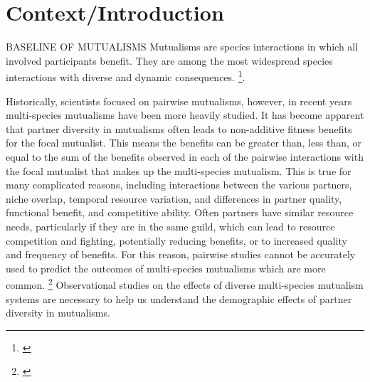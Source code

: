 \documentclass[12pt,a4paper]{article}
\newcommand{\ali}[2]{{\color{pink}{#1}}\footnote{\textit{\color{pink}{#2}}}}
\begin{document}
\section*{Context/Introduction}
BASELINE OF MUTUALISMS
Mutualisms are species interactions in which all involved participants benefit. They are among the most widespread species interactions\cite{Chamberlain2014,Stachowicz2005,BoucherDouglasH.1985} with diverse and dynamic consequences. 
\ali{The benefits from these interactions are called rewards, but they require investment of resources into the interaction}{I'm honestly not sure if I need to explain this idea? Do I need to include more basic mutualism background? I have tried to shift this so that I cover a small amount and then jump into the idea of partner diversity in mutualisms instead}. 

Historically, scientists focused on pairwise mutualisms\cite{Bascompote2019}, however, in recent years multi-species mutualisms have been more heavily studied. 
It has become apparent that partner diversity in mutualisms often leads to non-additive fitness benefits for the focal mutualist\cite{Afkhami2014, Palmer2010}. 
This means the benefits can be greater than, less than, or equal to the sum of the benefits observed in each of the pairwise interactions with the focal mutualist that makes up the multi-species mutualism. 
This is true for many complicated reasons, including interactions between the various partners, niche overlap, temporal resource variation, and differences in partner quality, functional benefit, and competitive ability\cite{stanton2013, Afkhami2014,Boucher1982}.
Often partners have similar resource needs, particularly if they are in the same guild, which can lead to resource competition and fighting, potentially reducing benefits, or to increased quality and frequency of benefits\cite{Bascompote2019,Stanton2003}.
For this reason, pairwise studies cannot be accurately used to predict the outcomes of multi-species mutualisms\cite{Palmer2010, Stanton2013. Chamberlain2014, Song2020} which are more common.
\ali{***** Biodiversity ecosystem function? }{After this I feel like I go straight into the mechanisms which explain the potential positive effects of diversity, but I don't specify that I am talking about those and I also don't talk about any explanations of negative effects? Maybe if I include the connection between BEF theory and mutualisms here it will make a nice bridge to the benefits of diversity?} 
Observational studies on the effects of diverse multi-species mutualism systems are necessary to help us understand the demographic effects of partner diversity in mutualisms. 
\end{document}

